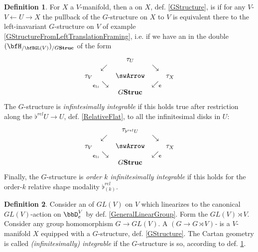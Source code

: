 \documentclass[12pt,titlepage]{article}
\def\mathllap{\mathpalette\mathllapinternal}
\def\mathrlap{\mathpalette\mathrlapinternal}
\def\mathllapinternal#1#2{\llap{$\mathsurround=0pt#1{#2}$}}
\def\mathrlapinternal#1#2{\rlap{$\mathsurround=0pt#1{#2}$}}
\newcommand{\itexarray}[1]{\begin{matrix}#1\end{matrix}}
\theoremstyle{plain}
\theoremstyle{definition}
\newtheorem{defn}{Definition}
\theoremstyle{remark}
\begin{document}
\begin{defn}
\label{IntegrabilityOfGStructure}\hypertarget{IntegrabilityOfGStructure}{}
For $X$ a $V$-manifold, then a  on $X$, def. \ref{GStructure}, is  if for any $V$- $V \leftarrow U \rightarrow X$ the pullback of the $G$-structure on $X$ to $V$ is equivalent there to the left-inavariant $G$-structure on $V$ of example \ref{GStructureFromLeftTranslationFraming}, i.e. if we have an  in the double  $(\bfH_{/\bfBGL(V)})_{/G\mathbf{Struc}}$ of the form
\begin{displaymath}
\itexarray{
&& \tau_U
\\
& \swarrow && \searrow
\\
\tau_V && \swArrow && \tau_X
\\
& {}_{\mathllap{\mathbf{c}_{li}}}\searrow && \swarrow_{\mathrlap{\mathbf{c}}}
\\
&& G \mathbf{Struc}
}
\end{displaymath}
The $G$-structure is \emph{infintesimally integrable} if this holds true after restriction along the  $\flat^{rel} U \to U$, def. \ref{RelativeFlat}, to all the infinitesimal disks in $U$:
\begin{displaymath}
\itexarray{
&& \tau_{\flat^{rel}U}
\\
& \swarrow && \searrow
\\
\tau_V && \swArrow && \tau_X
\\
& {}_{\mathllap{\mathbf{c}_{li}}}\searrow && \swarrow_{\mathrlap{\mathbf{c}}}
\\
&& G \mathbf{Struc}
}
\end{displaymath}
Finally, the $G$-structure is \emph{order $k$ infinitesimally integrable} if this holds for the order-$k$ relative shape modality $\flat^{rel}_{(k)}$.
\end{defn}
\begin{defn}
\label{CartanGeometry}\hypertarget{CartanGeometry}{}
Consider an  of $GL(V)$ on $V$ which linearizes to the canonical $GL(V)$-action on $\bbD^V_e$ by def. \ref{GeneralLinearGroup}. Form the  $GL(V) \rtimes V$. Consider any group homomorphism $G\to GL(V)$.
A \emph{$(G\to G\rtimes V)$-} is a $V$-manifold $X$ equipped with a $G$-structure, def. \ref{GStructure}. The Cartan geometry is called \emph{(infinitesimally) integrable} if the $G$-structure is so, according to def. \ref{IntegrabilityOfGStructure}.
\end{defn}
\end{document}
